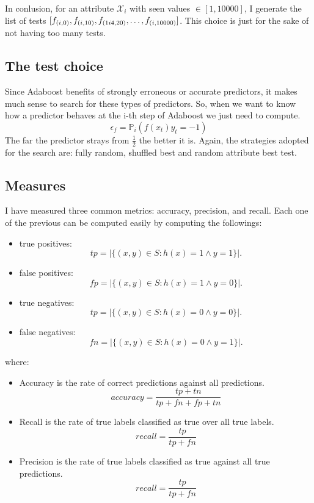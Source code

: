 \documentclass{article}
\begin{document}
In conlusion, for an attribute $\mathcal{X}_i$ with seen values $\in [1,10000]$, I generate the list of tests
$[f_{(i,0)},f_{(i,10)}, \\f_{(1i4,20)},\dots, f_{(i,10000)}]$. This choice is just for the sake of
not having too many tests.

\subsection{The test choice}
Since Adaboost benefits of strongly erroneous or accurate predictors, it makes much sense to search
for these types of predictors. So, when we want to know how a predictor behaves at the i-th step of Adaboost
we just need to compute. 
$$\epsilon_f = \mathbb{P}_i(f(x_t) y_t = -1)$$
The far the predictor strays from $\frac{1}{2}$ the better it is.
Again, the strategies adopted for the search are: fully random, shuffled best and random attribute best test.

\subsection{Measures}
I have measured three common metrics: accuracy, precision, and recall.
Each one of the previous can be computed easily by computing the followings:
\begin{itemize}
	\item true positives:
	$$tp = |\{(x,y)\in S : h(x) = 1 \wedge y = 1\}|.$$
	\item false positives:
	$$fp = |\{(x,y)\in S : h(x) = 1 \wedge y = 0\}|.$$
	\item true negatives:
	$$tp = |\{(x,y)\in S : h(x) = 0 \wedge y = 0\}|.$$
	\item false negatives:
	$$fn = |\{(x,y)\in S : h(x) = 0 \wedge y = 1\}|.$$
\end{itemize}
where:
\begin{itemize}
	\item Accuracy is the rate of correct predictions against all predictions.
	$$accuracy = \frac{tp+tn}{tp+fn+fp+tn}$$
	\item Recall is the rate of true labels classified as true over all true labels.
	$$recall = \frac{tp}{tp+fn}$$
	\item Precision is the rate of true labels classified as true against all true predictions.
	$$recall = \frac{tp}{tp+fn}$$

\end{itemize}
\end{document}

